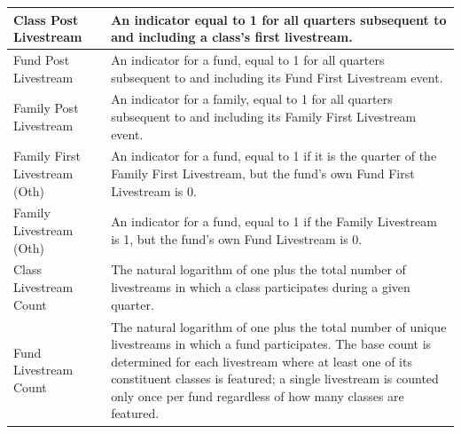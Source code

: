\begin{longtable}{lp{}}
    \midrule
    Class Post Livestream          & An indicator equal to 1 for all quarters subsequent to and including a class's first livestream.                                                                                                                                                                                                                  \\
    \midrule
    Fund Post Livestream           & An indicator for a fund, equal to 1 for all quarters subsequent to and including its Fund First Livestream event.                                                                                                                                                                                                 \\
    \midrule
    Family Post Livestream         & An indicator for a family, equal to 1 for all quarters subsequent to and including its Family First Livestream event.                                                                                                                                                                                             \\
    \midrule
    Family First Livestream (Oth)  & An indicator for a fund, equal to 1 if it is the quarter of the Family First Livestream, but the fund's own Fund First Livestream is 0.                                                                                                                                                                           \\
    \midrule
    Family Livestream (Oth)        & An indicator for a fund, equal to 1 if the Family Livestream is 1, but the fund's own Fund Livestream is 0.                                                                                                                                                                                                       \\
    \midrule
    Class Livestream Count         & The natural logarithm of one plus the total number of livestreams in which a class participates during a given quarter.                                                                                                                                                                                           \\
    \midrule
    Fund Livestream Count          & The natural logarithm of one plus the total number of unique livestreams in which a fund participates. The base count is determined for each livestream where at least one of its constituent classes is featured; a single livestream is counted only once per fund regardless of how many classes are featured. \\

\end{longtable}
